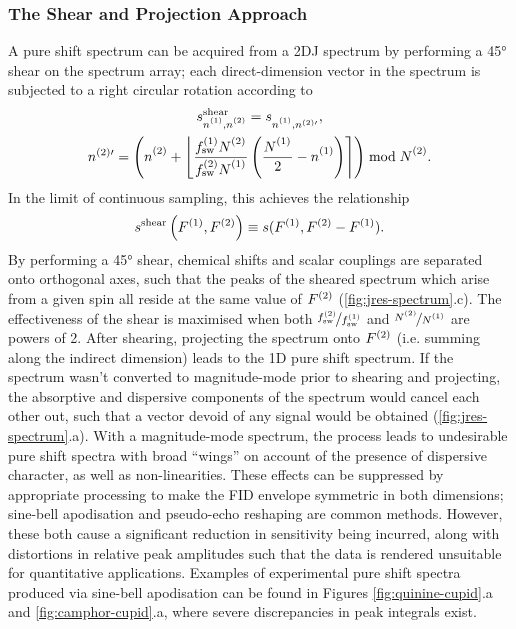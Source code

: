 \subsubsection{The Shear and Projection Approach}
A pure shift spectrum can be acquired from a \ac{2DJ} spectrum by performing a
\ang{45} shear on the spectrum array; each direct-dimension vector in the
spectrum is subjected to a right circular rotation according to
\begin{subequations}
    \begin{gather}
        s_{\none,\ntwo}^{\text{shear}} =
            s_{\none,n^{(2)\prime}}^{\vphantom{{\text{tilt}}}},\\
        n^{(2)\prime} = \left(\ntwo + \left\lfloor
                \frac
                    {\fswone \Ntwo\vpsub{\mathrm{sw}}}
                    {\fswtwo \None\vpsub{\mathrm{sw}}}
                \left(
                    \frac{\None\vpsub{\mathrm{sw}}}{2} - \none
                \right)
            \right\rceil
        \right) \bmod \Ntwo.
    \end{gather}
\end{subequations}
In the limit of continuous sampling, this achieves the relationship
\[
    s^{\text{shear}}\left(F^{(1)},F^{(2)}\right) \equiv s(F^{(1)}, F^{(2)} - F^{(1)}).
\]
By performing a \ang{45} shear, chemical shifts and scalar couplings are
separated onto orthogonal axes,
such that the peaks of the sheared spectrum which arise from a given spin all
reside at the same value of $F^{(2)}$ (\cref{fig:jres-spectrum}.c). The
effectiveness of the shear is maximised when both $\nicefrac{f_{\mathrm{sw}}^{(2)}}{f_{\mathrm{sw}}^{(1)}}$
and $\nicefrac{\Ntwo}{\None}$ are powers of 2. After shearing, projecting the
spectrum onto $F^{(2)}$ (i.e. summing along the indirect dimension) leads
to the \ac{1D} pure shift spectrum.
If the spectrum wasn't converted to magnitude-mode prior to shearing and
projecting, the absorptive and dispersive components of the spectrum would
cancel each other out, such that a vector devoid of any signal would be
obtained (\cref{fig:jres-spectrum}.a).
With a magnitude-mode spectrum, the process leads to undesirable pure shift
spectra with broad ``wings'' on account of the presence of dispersive
character, as well as non-linearities. These effects can be suppressed by
appropriate
processing to make the FID envelope symmetric in both dimensions;
sine-bell apodisation and pseudo-echo reshaping\cite{Bax1981} are common methods.
However, these both cause a significant reduction in sensitivity being
incurred, along with distortions in relative peak amplitudes such that the data is
rendered unsuitable for quantitative applications. Examples of experimental
pure shift spectra produced via sine-bell apodisation can be found in
Figures \ref{fig:quinine-cupid}.a and \ref{fig:camphor-cupid}.a, where
severe discrepancies in peak integrals exist.

